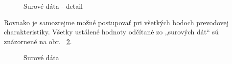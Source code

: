 \documentclass[a4paper, 10pt, ]{article}
\begin{document}
\begin{figure}[!ht]
	\centering


    \vspace{-6pt}

	\caption{Surové dáta - detail}
	\label{Surové dáta - detail3}

    \vspace{-6pt}

\end{figure}




Rovnako je samozrejme možné postupovať pri všetkých bodoch prevodovej charakteristiky. Všetky ustálené hodnoty odčítané zo „surových dát“ sú znázornené na obr.~ \ref{Surové dáta2}.


\begin{figure}[!ht]
	\centering

    \vspace{-6pt}


    \vspace{-6pt}

	\caption{Surové dáta}
	\label{Surové dáta2}

    \vspace{-6pt}

\end{figure}
\end{document}
